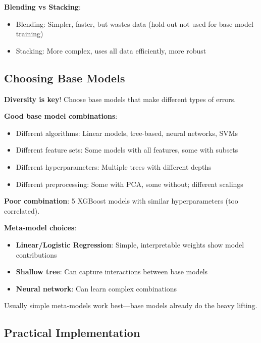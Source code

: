 \documentclass[11pt,twoside]{article}
\numberwithin{equation}{section}
\theoremstyle{plain}
\theoremstyle{definition}
\theoremstyle{remark}
\newenvironment{keyidea}{
  \begin{tcolorbox}[colback=yellow!5!white,
                    colframe=yellow!50!black,
                    title=Key Idea,
                    breakable,
                    enhanced,
                    sharp corners,
                    boxrule=0.8pt,
                    left=6pt, right=6pt, top=6pt, bottom=6pt]
}{
  \end{tcolorbox}
}
\begin{document}
\textbf{Blending vs Stacking}:
\begin{itemize}
\item Blending: Simpler, faster, but wastes data (hold-out not used for base model training)
\item Stacking: More complex, uses all data efficiently, more robust
\end{itemize}

\subsection{Choosing Base Models}

\begin{keyidea}
\textbf{Diversity is key}! Choose base models that make different types of errors.

\textbf{Good base model combinations}:
\begin{itemize}
\item Different algorithms: Linear models, tree-based, neural networks, SVMs
\item Different feature sets: Some models with all features, some with subsets
\item Different hyperparameters: Multiple trees with different depths
\item Different preprocessing: Some with PCA, some without; different scalings
\end{itemize}

\textbf{Poor combination}: 5 XGBoost models with similar hyperparameters (too correlated).

\textbf{Meta-model choices}:
\begin{itemize}
\item \textbf{Linear/Logistic Regression}: Simple, interpretable weights show model contributions
\item \textbf{Shallow tree}: Can capture interactions between base models
\item \textbf{Neural network}: Can learn complex combinations
\end{itemize}

Usually simple meta-models work best---base models already do the heavy lifting.
\end{keyidea}

\subsection{Practical Implementation}
\end{document}
